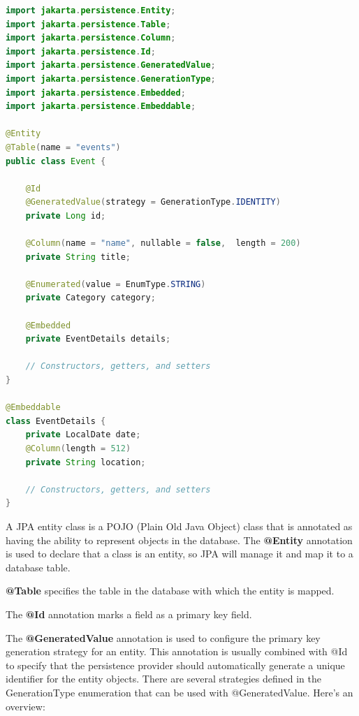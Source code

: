 \begin{lstlisting}[frame=single,language=java]
import jakarta.persistence.Entity;
import jakarta.persistence.Table;
import jakarta.persistence.Column;
import jakarta.persistence.Id;
import jakarta.persistence.GeneratedValue;
import jakarta.persistence.GenerationType;
import jakarta.persistence.Embedded;
import jakarta.persistence.Embeddable;

@Entity
@Table(name = "events")
public class Event {

    @Id
    @GeneratedValue(strategy = GenerationType.IDENTITY)
    private Long id;

    @Column(name = "name", nullable = false,  length = 200)
    private String title;
    
    @Enumerated(value = EnumType.STRING)
    private Category category;

    @Embedded
    private EventDetails details;

    // Constructors, getters, and setters
}

@Embeddable
class EventDetails {
    private LocalDate date;
    @Column(length = 512)
    private String location;

    // Constructors, getters, and setters
}
\end{lstlisting}

A JPA entity class is a POJO (Plain Old Java Object) class  that is annotated as having the ability to represent objects in the database.
The \textbf{@Entity} annotation is used to declare that a class is an entity, so JPA will manage it and map it to a database table.

\textbf{@Table} specifies the table in the database with which the entity is mapped.

The \textbf{@Id} annotation marks a field as a primary key field.

The \textbf{@GeneratedValue} annotation is used to configure the primary key generation strategy for an entity. This annotation is usually combined with @Id to specify that the persistence provider should automatically generate a unique identifier for the entity objects. There are several strategies defined in the GenerationType enumeration that can be used with @GeneratedValue. Here's an overview:

